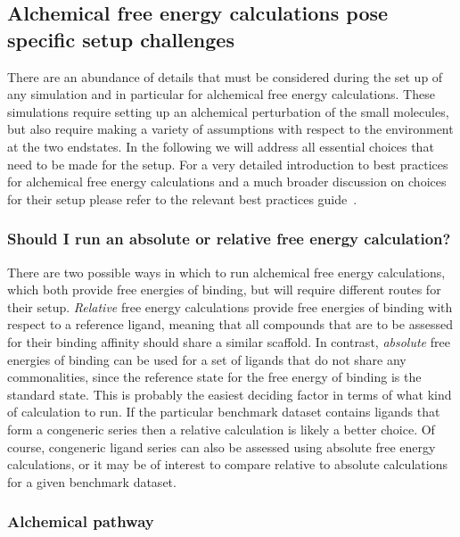 \documentclass[9pt,bestpractices]{livecoms}
\begin{document}
\subsection{Alchemical free energy calculations pose specific setup challenges}
\label{sec:alchemical_prep}

There are an abundance of details that must be considered during the set up of any simulation and in particular for alchemical free energy calculations. These simulations require setting up an alchemical perturbation of the small molecules, but also require making a variety of  assumptions with respect to the environment at the two endstates. In the following we will address all essential choices that need to be made for the setup. For a very detailed introduction to best practices for alchemical free energy calculations and a much broader discussion on choices for their setup please refer to the relevant best practices guide~\cite{meyBestPracticesAlchemical2020}. 

\subsubsection{Should I run an absolute or relative free energy calculation?}
There are two possible ways in which to run alchemical free energy calculations, which both provide free energies of binding, but will require different routes for their setup. \textit{Relative} free energy calculations provide free energies of binding with respect to a reference ligand, meaning that all compounds that are to be assessed for their binding affinity should share a similar scaffold. In contrast, \textit{absolute} free energies of binding can be used for a set of ligands that do not share any commonalities, since the reference state for the free energy of binding is the standard state. This is probably the easiest deciding factor in terms of what kind of calculation to run. If the particular benchmark dataset contains ligands that form a congeneric series then a relative calculation is likely a better choice. Of course, congeneric ligand series can also be assessed using absolute free energy calculations, or it may be of interest to compare relative to absolute calculations for a given benchmark dataset. 


\subsubsection{Alchemical pathway}
\end{document}
